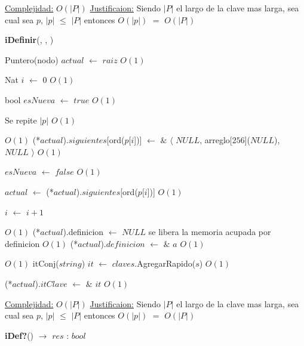 \begin{Algoritmos}
\begin{algorithm}[H]
\begin{algorithmic}[1]
\medskip
\State \underline{Complejidad:} $O(|P|)$
\State \underline{Justificaion:} Siendo $|P|$ el largo de la clave mas larga, sea cual sea $p$, $|p|$ $\leq$ $|P|$ entonces 	$O(|p|)$ $=$ $O(|P|)$

\end{algorithmic}
\end{algorithm}
  

\begin{algorithm}[H]
{\textbf{iDefinir}(, , )}
\begin{algorithmic}[1]

\State Puntero(nodo) $actual$ $\gets$ $raiz$ \Comment $O(1)$

\State Nat $i$ $\gets$ $0$ \Comment $O(1)$

\State bool $esNueva$ $\gets$ $true$ \Comment $O(1)$

   \Comment Se repite $|p|$ $O(1)$
	
	
	 \Comment $O(1)$
		\State (*$actual$).$siguientes$[ord($p$[$i$])] $\gets$	 $\&$ $\langle$ $NULL$, arreglo[$256$]($NULL$), $NULL$ $\rangle$  \Comment $O(1)$
		
		\State $esNueva$ $\gets$ $false$ \Comment $O(1)$	 
	
	\EndIf
	
	\State $actual$ $\gets$ (*$actual$).$siguientes$[ord($p$[$i$])] \Comment $O(1)$

	\State $i$ $\gets$ $i + 1$
\EndWhile 

 \Comment $O(1)$
	\State (*$actual$).definicion $\gets$ $NULL$ \Comment se libera la memoria acupada por definicion $O(1)$
\EndIf
\State (*$actual$).$definicion$ $\gets$ $\&$ $a$ \Comment $O(1)$

 \Comment $O(1)$
	\State itConj($string$) $it$ $\gets$  $claves$.AgregarRapido($s$) \Comment $O(1)$
	
	\State (*$actual$).$itClave$ $\gets$ $\&$ $it$ \Comment $O(1)$
\EndIf

\medskip
\State \underline{Complejidad:} $O(|P|)$
\State \underline{Justificaion:} Siendo $|P|$ el largo de la clave mas larga, sea cual sea $p$, $|p|$ $\leq$ $|P|$ entonces 	$O(|p|)$ $=$ $O(|P|)$


\end{algorithmic}
\end{algorithm}  
  
  
\begin{algorithm}[H]
{\textbf{iDef?}() $\to$ $res$ : $bool$}
\begin{algorithmic}[1]


\end{algorithmic}
\end{algorithm}
\end{Algoritmos}
